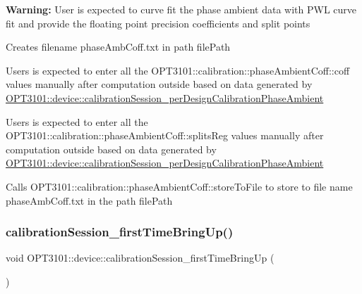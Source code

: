 \begin{DoxyItemize}
\item {\bfseries Warning\+:} User is expected to curve fit the phase ambient data with P\+WL curve fit and provide the floating point precision coefficients and split points ~\newline
~\newline
~\newline
~\newline

\item Creates filename phase\+Amb\+Coff.\+txt in path file\+Path
\item Users is expected to enter all the O\+P\+T3101\+::calibration\+::phase\+Ambient\+Coff\+::coff values manually after computation outside based on data generated by \mbox{\hyperlink{class_o_p_t3101_1_1device_a94c4e35aa43bc53eb8fe0d4c364aea25}{O\+P\+T3101\+::device\+::calibration\+Session\+\_\+per\+Design\+Calibration\+Phase\+Ambient}}
\item Users is expected to enter all the O\+P\+T3101\+::calibration\+::phase\+Ambient\+Coff\+::splits\+Reg values manually after computation outside based on data generated by \mbox{\hyperlink{class_o_p_t3101_1_1device_a94c4e35aa43bc53eb8fe0d4c364aea25}{O\+P\+T3101\+::device\+::calibration\+Session\+\_\+per\+Design\+Calibration\+Phase\+Ambient}}
\item Calls O\+P\+T3101\+::calibration\+::phase\+Ambient\+Coff\+::store\+To\+File to store to file name phase\+Amb\+Coff.\+txt in the path file\+Path 
\end{DoxyItemize}\mbox{\label{class_o_p_t3101_1_1device_a0dd8c59bc93c392f8d3f430697457415}} 
\subsubsection{\texorpdfstring{calibration\+Session\+\_\+first\+Time\+Bring\+Up()}{calibrationSession\_firstTimeBringUp()}}
{\footnotesize\ttfamily void O\+P\+T3101\+::device\+::calibration\+Session\+\_\+first\+Time\+Bring\+Up (\begin{DoxyParamCaption}{ }\end{DoxyParamCaption})}



